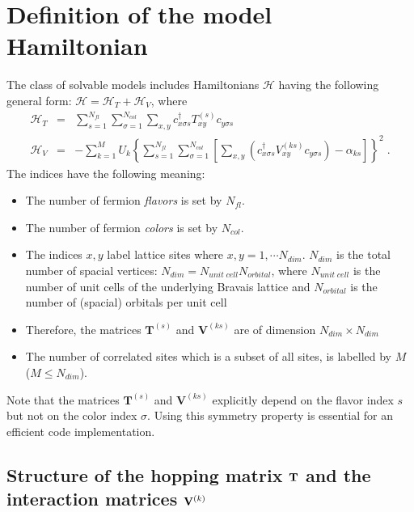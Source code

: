

\section{Definition of the model Hamiltonian}
The class of solvable models includes  Hamiltonians $\mathcal{H}$ having the following general form:
${\mathcal{H}=\mathcal{H}_{T}+\mathcal{H}_{V}}$, where
\begin{eqnarray}
\label{eqn_general_ham2}
\mathcal{H}_{T}
&=&
\sum\limits_{s=1}^{N_{fl}}
\sum\limits_{\sigma=1}^{N_{col}}
\sum\limits_{x,y}
c^{\dagger}_{x \sigma   s}T_{xy}^{(s)} c^{\phantom\dagger}_{y \sigma s}\\
\mathcal{H}_{V}
&=&
-
\sum\limits_{k=1}^{M}U_{k}
\left\{
\sum\limits_{s=1}^{N_{fl}}
\sum\limits_{\sigma=1}^{N_{col}}
\left[
\sum\limits_{x,y}
\left(
c^{\dagger}_{x \sigma s}V_{xy}^{(k s)}c^{\phantom\dagger}_{y \sigma s}
\right)
-\alpha_{k s} 
\right]
\right\}^{2}\;.
\end{eqnarray}
The indices have the following meaning:
\begin{itemize}
\item The number of fermion \textit{flavors} is set by $N_{fl}$. 
\item The number of fermion \textit{colors} is set by $N_{col}$. 
\item The indices $x,y$ label lattice sites where $x,y=1,\cdots N_{dim}$. 
$N_{dim}$ is the total number of spacial vertices: $N_{dim}=N_{unit\;cell} N_{orbital}$, where $N_{unit\;cell}$ is the number of unit cells of the underlying Bravais lattice and $N_{orbital}$ is the number of (spacial) orbitals per unit cell  
\item Therefore, the  matrices $\bm{T}^{(s)}$ and $\bm{V}^{(ks)}$ are  of dimension $N_{dim}\times N_{dim}$
\item The number of correlated sites which is a subset of all sites, is labelled by $M$  ($M\leq N_{dim}$).
\end{itemize}
Note that the matrices  $\bm{T}^{(s)}$ and $\bm{V}^{(ks)}$ explicitly depend on the flavor index $s$ but not on the color index $\sigma$. 
Using this symmetry property is essential for an efficient code implementation.


\subsection{Structure of the hopping matrix  ${\bf T}$ and the interaction matrices ${\bf V}^{(k)}$}

